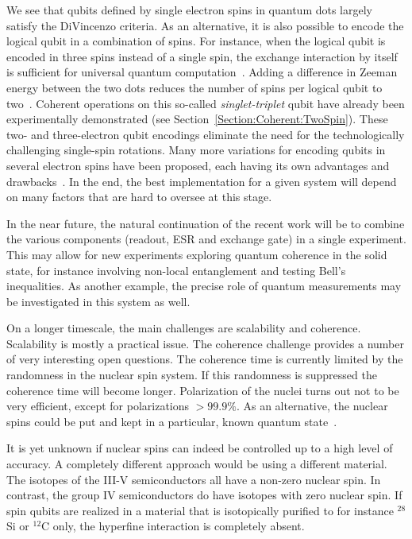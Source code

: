 \documentclass[rmp,twocolumn,aps]{revtex4}
\begin{document}
We see that qubits defined by single electron spins in quantum dots largely satisfy the DiVincenzo criteria. As an alternative, it is also possible to encode the logical qubit in a combination of spins. For instance, when the logical qubit is encoded in three spins instead of 
a single spin, the exchange interaction by itself is sufficient for universal quantum computation~\cite{DiVincenzoNature2000}. Adding a difference in Zeeman energy between the two dots reduces the number of spins per logical qubit to two~\cite{Levy}. Coherent operations on this so-called \textit{singlet-triplet} qubit have already been experimentally demonstrated (see Section~\ref{Section:Coherent:TwoSpin}). These two- and three-electron qubit encodings eliminate the need for the technologically challenging single-spin rotations. Many more variations for encoding qubits in several electron spins have been proposed, each having its own advantages and drawbacks~\cite{wulidar02a, wulidar02b,ByrdLidar,Meier,Kyriakidis2005,TaylerNaturePhysics2005,hanson06}. In the end, the best implementation for a given system will depend on many factors that are hard to oversee at this stage.

In the near future, the natural continuation of the recent work will be to combine the various components (readout, ESR and exchange gate) in a single experiment. This may allow for new experiments exploring quantum coherence in the solid state, for instance involving non-local entanglement and testing Bell's inequalities. As another example, the precise role of quantum measurements may be investigated in this system as well.

On a longer timescale, the main challenges are scalability and coherence. Scalability is mostly a practical issue. The coherence challenge provides a number of very interesting open questions. The coherence time is currently limited by the randomness in the nuclear spin system. If this randomness is 
suppressed the coherence time will become longer. Polarization of the nuclei turns out not to be very efficient, except for polarizations $> 99.9\%$. As an alternative, the nuclear spins could be put and kept in a particular, known quantum state~\cite{giedke06,klauser06,stepanenko06}. %

It is yet unknown if nuclear spins can indeed be controlled up to
a high level of accuracy. A completely different approach would be
using a different material. The isotopes of the III-V
semiconductors all have a non-zero nuclear spin. In contrast, the
group IV semiconductors do have isotopes with zero nuclear spin.
If spin qubits are realized in a material that is isotopically
purified to for instance $^{28}$Si or $^{12}$C only, the hyperfine interaction is completely absent.
\end{document}
